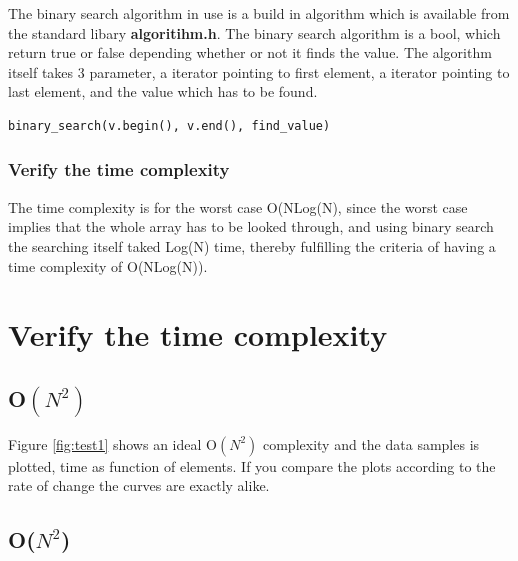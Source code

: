 The binary search algorithm in use is a build in algorithm which is available from the standard libary \textbf{algoritihm.h}. The binary search algorithm is a bool, which return true or false depending whether or not it finds the value.  The algorithm itself takes 3 parameter, 	a iterator pointing to first element, a iterator pointing to last element, and the value which has to be found. 
\begin{lstlisting}
binary_search(v.begin(), v.end(), find_value)
\end{lstlisting}


\subsubsection{Verify the time complexity}

The time complexity is for the worst case O(NLog(N), since the worst case implies that the whole array has to be looked through, and using binary search the  searching itself taked Log(N) time, thereby fulfilling the criteria of having a time complexity of O(NLog(N)).    
\\



\section{Verify the time complexity}


\subsection{O\(\left( { N }^{ 2 } \right)\)}
Figure \ref{fig:test1} shows an ideal O\(\left( { N }^{ 2 } \right)\) complexity and the data samples is plotted, time as function of elements. If you compare the plots according to the rate of change the curves are exactly alike. 




\subsection{O(\(N^{2}\))}



